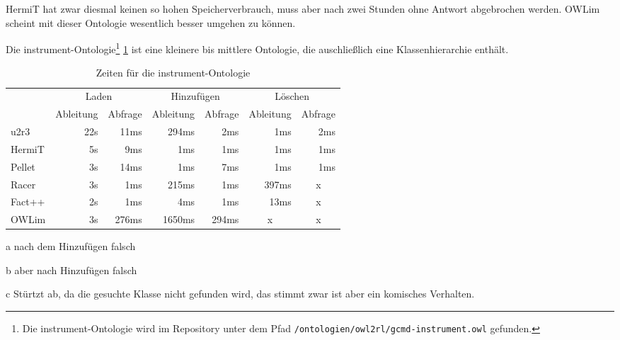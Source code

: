 HermiT hat zwar diesmal keinen so hohen Speicherverbrauch, muss aber nach zwei Stunden ohne Antwort abgebrochen werden. OWLim scheint mit dieser Ontologie wesentlich besser umgehen zu können.

Die instrument-Ontologie\footnote{Die instrument-Ontologie wird im Repository unter dem Pfad \texttt{/ontologien/owl2rl/gcmd-instrument.owl} gefunden.} \ref{table-time-instrument} ist eine kleinere bis mittlere Ontologie, die auschließlich eine Klassenhierarchie enthält.

\begin{table}[htbp]
\caption{Zeiten für die instrument-Ontologie}
\label{table-time-instrument}
\begin{center}
\begin{threeparttable}
\begin{tabular}{l|r|r|r|r|r|r|}
\cline{2-7}
 & \multicolumn{2}{|c|}{Laden} & \multicolumn{2}{|c|}{Hinzufügen} & \multicolumn{2}{|c|}{Löschen} \\
\cline{2-7}
 & \multicolumn{1}{|c|}{Ableitung} & \multicolumn{1}{|c|}{Abfrage} & \multicolumn{1}{|c|}{Ableitung} & \multicolumn{1}{|c|}{Abfrage} & \multicolumn{1}{|c|}{Ableitung} & \multicolumn{1}{|c|}{Abfrage} \\
\hline
\multicolumn{1}{|l|}{u2r3} & 22s & 11ms & 294ms & 2ms & 1ms & 2ms \\ \hline
\multicolumn{1}{|l|}{HermiT\tnote{a}} & 5s & 9ms & 1ms & 1ms & 1ms & 1ms \\ \hline
\multicolumn{1}{|l|}{Pellet\tnote{b}} & 3s & 14ms & 1ms & 7ms & 1ms & 1ms \\ \hline
\multicolumn{1}{|l|}{Racer\tnote{c}} & 3s & 1ms & 215ms & 1ms & 397ms & \multicolumn{1}{c|}{x} \\ \hline
\multicolumn{1}{|l|}{Fact++\tnote{c}} & 2s & 1ms & 4ms & 1ms & 13ms & \multicolumn{1}{c|}{x} \\ \hline
\multicolumn{1}{|l|}{OWLim} & 3s & 276ms & 1650ms & 294ms & \multicolumn{1}{c|}{x} & \multicolumn{1}{c|}{x} \\ \hline
\end{tabular}
\begin{tablenotes}
	\item[a] nach dem Hinzufügen falsch
	\item[b] aber nach Hinzufügen falsch
	\item[c] Stürtzt ab, da die gesuchte Klasse nicht gefunden wird, das stimmt zwar ist aber ein komisches Verhalten.
\end{tablenotes}
\end{threeparttable}
\end{center}
\end{table}

